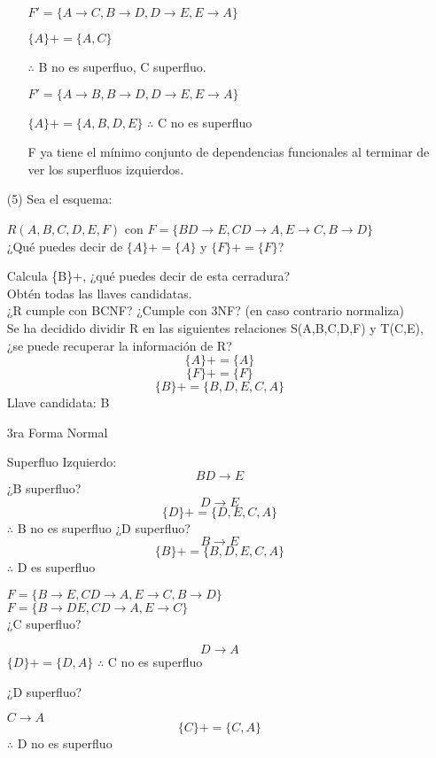 \documentclass{article}
\begin{document}
\begin{enumerate}
\begin{enumerate}
      $F'=\{A \rightarrow C, B \rightarrow D, D\rightarrow E, E\rightarrow A\}$

      $\{A\}+=\{A,C\}$

      $\therefore$ B no es superfluo, C superfluo.

      $F'=\{A \rightarrow B, B \rightarrow D, D\rightarrow E, E \rightarrow A\}$

      $\{A\}+=\{A,B,D,E\}$
      $\therefore$ C no es superfluo

      F ya tiene el mínimo conjunto de dependencias funcionales al terminar de
      ver los superfluos izquierdos.
    \end{enumerate}

    \item[(5)] Sea el esquema:

    $R(A,B,C,D,E,F)$ con $F=\{BD \rightarrow E, CD \rightarrow A, E \rightarrow C, B \rightarrow D\}$\\
    ¿Qué puedes decir de $\{A\}+ = \{A\}$ y $\{F\}+=\{F\}$?

    Calcula \{B\}+, ¿qué puedes decir de esta cerradura?\\
    Obtén todas las llaves candidatas.\\
    ¿R cumple con BCNF? ¿Cumple con 3NF? (en caso contrario normaliza)\\
    Se ha decidido dividir R en las siguientes relaciones S(A,B,C,D,F) y T(C,E), ¿se puede recuperar la
    información de R?
    $$\{ A\}+=\{ A\}$$
    $$\{ F\}+=\{ F\}$$
    $$\{ B\}+=\{ B,D,E,C,A\}$$
    Llave candidata: B

    3ra Forma Normal

    Superfluo Izquierdo:
    $$BD \rightarrow E$$
    ¿B superfluo?
    $$D\rightarrow E$$
    $$\{ D\}+=\{ D,E,C,A\}$$
    $\therefore$ B no es superfluo
    ¿D superfluo?
    $$B\rightarrow E$$
    $$\{ B\}+=\{ B,D,E,C,A\}$$
    $\therefore$ D es superfluo

    $F=\{B \rightarrow E, CD \rightarrow A, E \rightarrow C, B\rightarrow D\}$\\
    $F=\{B \rightarrow DE, CD \rightarrow A, E \rightarrow C\}$\\

    ¿C superfluo?

    $$D\rightarrow A$$
    $\{ D\}+=\{ D,A\}$
    $\therefore$ C no es superfluo

    ¿D superfluo?

    $C \rightarrow A$
    $$\{ C\}+=\{ C,A\}$$
    $\therefore$ D no es superfluo


\end{enumerate}
\end{document}
